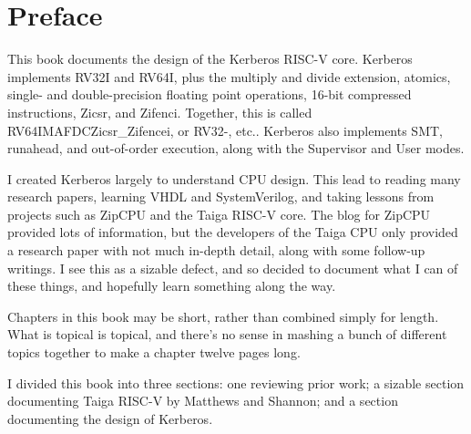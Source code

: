 \chapter*{Preface}
This book documents the design of the Kerberos RISC-V core.  Kerberos implements RV32I and RV64I, plus the multiply and divide extension, atomics, single- and double-precision floating point operations, 16-bit compressed instructions, Zicsr, and Zifenci.  Together, this is called RV64IMAFDCZicsr\_Zifencei, or RV32-, etc..  Kerberos also implements SMT, runahead, and out-of-order execution, along with the Supervisor and User modes.

I created Kerberos largely to understand CPU design.  This lead to reading many research papers, learning VHDL and SystemVerilog, and taking lessons from projects such as ZipCPU and the Taiga RISC-V core.  The blog for ZipCPU provided lots of information, but the developers of the Taiga CPU only provided a research paper with not much in-depth detail, along with some follow-up writings.  I see this as a sizable defect, and so decided to document what I can of these things, and hopefully learn something along the way.

Chapters in this book may be short, rather than combined simply for length.  What is topical is topical, and there's no sense in mashing a bunch of different topics together to make a chapter twelve pages long.

I divided this book into three sections:  one reviewing prior work; a sizable section documenting Taiga RISC-V by Matthews and Shannon; and a section documenting the design of Kerberos.
